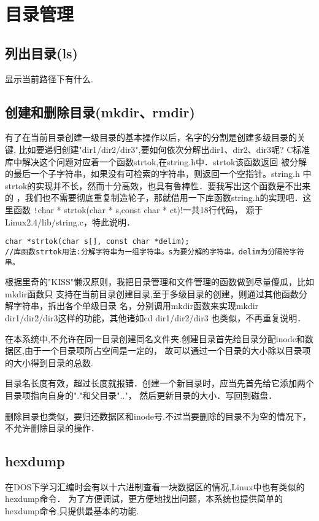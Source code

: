\section{目录管理}

\subsection{列出目录(ls)}
显示当前路径下有什么.

\subsection{创建和删除目录(mkdir、rmdir)}

有了在当前目录创建一级目录的基本操作以后，名字的分割是创建多级目录的关键,
比如要递归创建"dir1/dir2/dir3",要如何依次分解出dir1、dir2、dir3呢?
C标准库中解决这个问题对应着一个函数strtok,在string.h中．strtok该函数返回
被分解的最后一个子字符串，如果没有可检索的字符串，则返回一个空指针。string.h
中strtok的实现并不长，然而十分高效，也具有鲁棒性．要我写出这个函数是不出来的
，我们也不需要彻底重复制造轮子，那就借用一下库函数string.h的实现吧．这里函数
\texttt!char * strtok(char * s,const char * ct)!一共18行代码，
源于Linux2.4/lib/string.c，特此说明．

\begin{verbatim} 
char *strtok(char s[], const char *delim);
//库函数strtok用法:分解字符串为一组字符串。s为要分解的字符串，delim为分隔符字符串。
\end{verbatim}

根据里奇的"KISS"懒汉原则，我把目录管理和文件管理的函数做到尽量傻瓜，比如mkdir函数只
支持在当前目录创建目录,至于多级目录的创建，则通过其他函数分解字符串，拆出各个单级目录
名，分别调用mkdir函数来实现mkdir dir1/dir2/dir3这样的功能，其他诸如cd dir1/dir2/dir3
也类似，不再重复说明．

在本系统中,不允许在同一目录创建同名文件夹.创建目录首先给目录分配inode和数据区,由于一个目录项所占空间是一定的，
故可以通过一个目录的大小除以目录项的大小得到目录的总数.

目录名长度有效，超过长度就报错．创建一个新目录时，应当先首先给它添加两个目录项指向自身的"."和父目录".."，
然后更新目录的大小．写回到磁盘．

删除目录也类似，要归还数据区和inode号.不过当要删除的目录不为空的情况下，不允许删除目录的操作．

\subsection{hexdump}
在DOS下学习汇编时会有以十六进制查看一块数据区的情况,Linux中也有类似的hexdump命令．
为了方便调试，更方便地找出问题，本系统也提供简单的hexdump命令,只提供最基本的功能.

